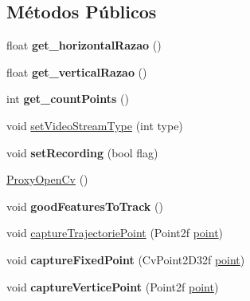 \subsection*{Métodos Públicos}
\begin{DoxyCompactItemize}
\item 
\hypertarget{classmodel_1_1ProxyOpenCv_a12fc0306cf3a4bff7dc8ba9d7616064a}{
float {\bfseries get\_\-horizontalRazao} ()}
\label{classmodel_1_1ProxyOpenCv_a12fc0306cf3a4bff7dc8ba9d7616064a}

\item 
\hypertarget{classmodel_1_1ProxyOpenCv_a2d4dce9d62c4d3c7ecb1422270ee4dad}{
float {\bfseries get\_\-verticalRazao} ()}
\label{classmodel_1_1ProxyOpenCv_a2d4dce9d62c4d3c7ecb1422270ee4dad}

\item 
\hypertarget{classmodel_1_1ProxyOpenCv_a99f875ba2dd2574cd05749cf359ac925}{
int {\bfseries get\_\-countPoints} ()}
\label{classmodel_1_1ProxyOpenCv_a99f875ba2dd2574cd05749cf359ac925}

\item 
void \hyperlink{classmodel_1_1ProxyOpenCv_a2c855ead2482e6c360026e027fb83551}{setVideoStreamType} (int type)
\item 
\hypertarget{classmodel_1_1ProxyOpenCv_acd83dc4f8cc15dbd4ac7ea85c7d4a294}{
void {\bfseries setRecording} (bool flag)}
\label{classmodel_1_1ProxyOpenCv_acd83dc4f8cc15dbd4ac7ea85c7d4a294}

\item 
\hyperlink{classmodel_1_1ProxyOpenCv_a5880785c54f72fc48d54d60a82905945}{ProxyOpenCv} ()
\item 
\hypertarget{classmodel_1_1ProxyOpenCv_a5ff3f13224c655b672f01edb2bfd4746}{
void {\bfseries goodFeaturesToTrack} ()}
\label{classmodel_1_1ProxyOpenCv_a5ff3f13224c655b672f01edb2bfd4746}

\item 
void \hyperlink{classmodel_1_1ProxyOpenCv_a678118d47bfc701836ac30d93737305c}{captureTrajectoriePoint} (Point2f \hyperlink{structpoint}{point})
\item 
\hypertarget{classmodel_1_1ProxyOpenCv_af1f766c4b97442bcd37f777ea5fb31e4}{
void {\bfseries captureFixedPoint} (CvPoint2D32f \hyperlink{structpoint}{point})}
\label{classmodel_1_1ProxyOpenCv_af1f766c4b97442bcd37f777ea5fb31e4}

\item 
\hypertarget{classmodel_1_1ProxyOpenCv_a32375764b54dcf24dd619d9a00c0dc70}{
void {\bfseries captureVerticePoint} (Point2f \hyperlink{structpoint}{point})}
\label{classmodel_1_1ProxyOpenCv_a32375764b54dcf24dd619d9a00c0dc70}


\end{DoxyCompactItemize}
